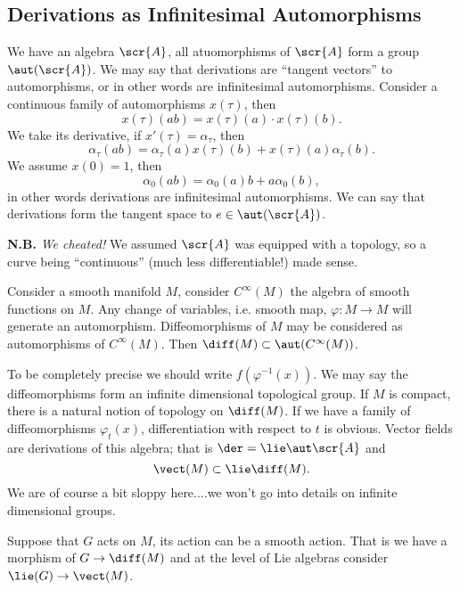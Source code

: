 \subsection{Derivations as Infinitesimal Automorphisms}
We have an algebra $\scr{A}$, all atuomorphisms of $\scr{A}$ form
a group $\aut(\scr{A})$. We may say that derivations are
``tangent vectors'' to automorphisms, or in other words are
infinitesimal automorphisms. Consider a continuous family of
automorphisms $x(\tau)$, then 
\begin{equation}
x(\tau)(ab)=x(\tau)(a)\cdot x(\tau)(b).
\end{equation}
We take its derivative, if $x'(\tau)=\alpha_{\tau}$, then
\begin{equation}
\alpha_{\tau}(ab)=\alpha_{\tau}(a)x(\tau)(b)+x(\tau)(a)\alpha_{\tau}(b).
\end{equation}
We assume $x(0)=1$, then
\begin{equation}
\alpha_{0}(ab)=\alpha_{0}(a)b+a\alpha_{0}(b),
\end{equation}
in other words derivations are infinitesimal automorphisms. We
can say that derivations form the tangent space to
$e\in\aut(\scr{A})$.

\noindent\textbf{N.B.} \emph{We cheated!} We assumed $\scr{A}$
was equipped with a topology, so a curve being ``continuous''
(much less differentiable!) made sense. 

Consider a smooth manifold $M$, consider $C^{\infty}(M)$ the
algebra of smooth functions on $M$. Any change of variables,
i.e. smooth map, $\varphi\colon M\to M$ will generate an
automorphism. Diffeomorphisms of $M$ may be considered as
automorphisms of $C^{\infty}(M)$. Then $\diff(M)\subset\aut(C^{\infty}(M))$.

To be completely precise we should write $f(\varphi^{-1}(x))$. We
may say the diffeomorphisms form an infinite dimensional
topological group. If $M$ is compact, there is a natural notion
of topology on $\diff(M)$. If we have a family of diffeomorphisms
$\varphi_{t}(x)$, differentiation with respect to $t$ is
obvious. Vector fields are derivations of this algebra; that is
$\der=\lie\aut\scr{A}$ and
\begin{equation}
\vect(M)\subset\lie\diff(M).
\end{equation}
We are of course a bit sloppy here....we won't go into details on
infinite dimensional groups.

Suppose that $G$ acts on $M$, its action can be a smooth
action. That is we have a morphism of $G\to\diff(M)$ and at the
level of Lie algebras consider $\lie(G)\to\vect(M)$.
